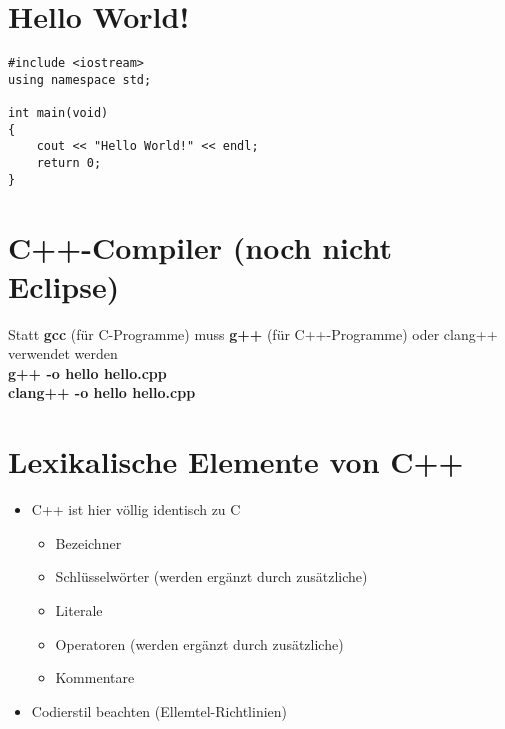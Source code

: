 \section{Hello World!}
\noindent
\begin{minipage}{\linewidth}
\begin{lstlisting}
#include <iostream>
using namespace std;

int main(void)
{
	cout << "Hello World!" << endl;
	return 0;
}
\end{lstlisting}
\end{minipage}

\section{C++-Compiler (noch nicht Eclipse)}
Statt \textbf{gcc} (für C-Programme) muss \textbf{g++} (für C++-Programme) oder clang++ verwendet werden\\
\textbf{g++ -o hello hello.cpp}\\
\textbf{clang++ -o hello hello.cpp}

\section{Lexikalische Elemente von C++}
\begin{itemize}
	\item C++ ist hier völlig identisch zu C
	\begin{itemize}
		\item Bezeichner
		\item Schlüsselwörter (werden ergänzt durch zusätzliche)
		\item Literale
		\item Operatoren (werden ergänzt durch zusätzliche)
		\item Kommentare
	\end{itemize}
	\item Codierstil beachten (Ellemtel-Richtlinien)
\end{itemize}

